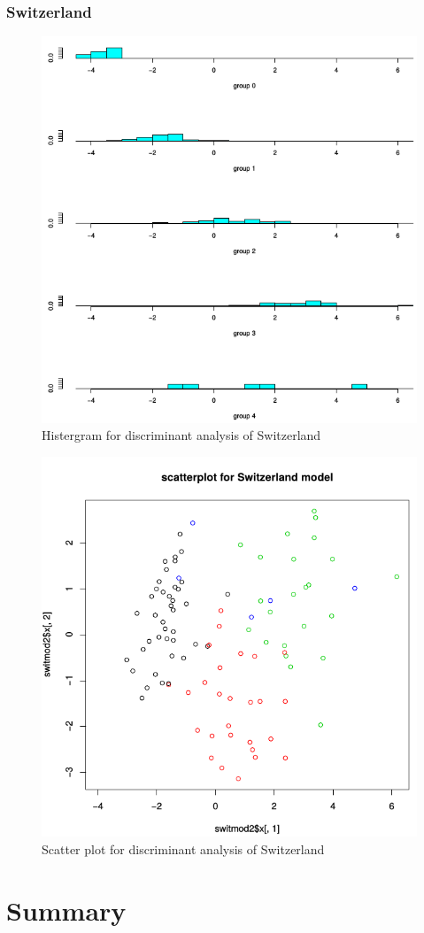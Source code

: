 \documentclass[a4paper]{article}
\begin{document}
\newpage
\subsubsection{Switzerland}



\begin{figure}[H]
	\begin{center}
		\includegraphics[width=12cm]{Q4_pics/Swit-Histgram.png}
	\end{center}
	\caption{Histergram for discriminant analysis of Switzerland}
	\label{q4_swit_historgram}
\end{figure}

\begin{figure}[H]
	\begin{center}
		\includegraphics[width=12cm]{Q4_pics/Swit-scatter.png}
	\end{center}
	\caption{Scatter plot for discriminant analysis of Switzerland}
	\label{q4_swit_scatter}
\end{figure}

\section{Summary}
\end{document}

